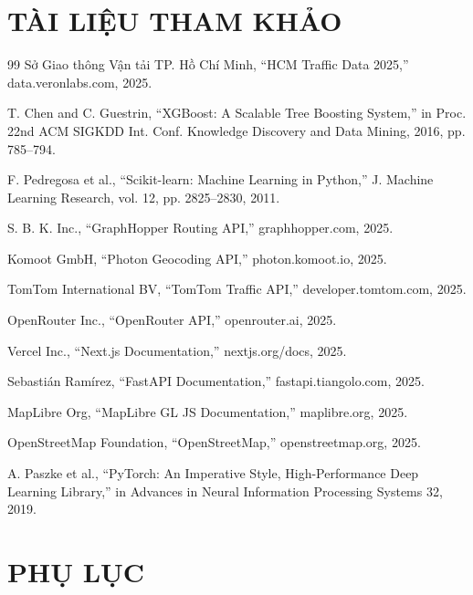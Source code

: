 \documentclass[12pt,a4paper]{article}
\begin{document}
\section{TÀI LIỆU THAM KHẢO}

\begin{thebibliography}{99}
Sở Giao thông Vận tải TP. Hồ Chí Minh, ``HCM Traffic Data 2025,'' data.veronlabs.com, 2025.

T. Chen and C. Guestrin, ``XGBoost: A Scalable Tree Boosting System,'' in Proc. 22nd ACM SIGKDD Int. Conf. Knowledge Discovery and Data Mining, 2016, pp. 785--794.

F. Pedregosa et al., ``Scikit-learn: Machine Learning in Python,'' J. Machine Learning Research, vol. 12, pp. 2825--2830, 2011.

S. B. K. Inc., ``GraphHopper Routing API,'' graphhopper.com, 2025.

Komoot GmbH, ``Photon Geocoding API,'' photon.komoot.io, 2025.

TomTom International BV, ``TomTom Traffic API,'' developer.tomtom.com, 2025.

OpenRouter Inc., ``OpenRouter API,'' openrouter.ai, 2025.

Vercel Inc., ``Next.js Documentation,'' nextjs.org/docs, 2025.

Sebastián Ramírez, ``FastAPI Documentation,'' fastapi.tiangolo.com, 2025.

MapLibre Org, ``MapLibre GL JS Documentation,'' maplibre.org, 2025.

OpenStreetMap Foundation, ``OpenStreetMap,'' openstreetmap.org, 2025.

A. Paszke et al., ``PyTorch: An Imperative Style, High-Performance Deep Learning Library,'' in Advances in Neural Information Processing Systems 32, 2019.

\end{thebibliography}

\clearpage
\appendix
\section*{PHỤ LỤC}
\end{document}
